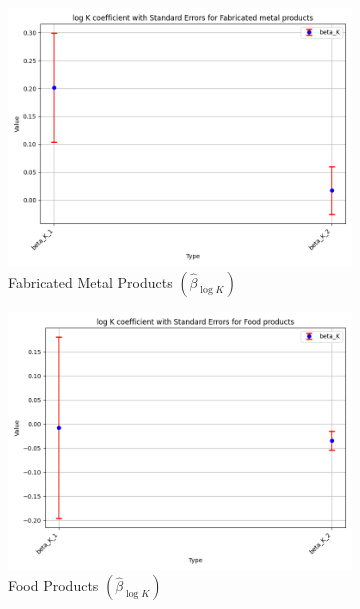 \documentclass{article}
\begin{document}
\begin{figure}[ht!]
    \begin{subfigure}[t]{0.32\textwidth}
        \centering
        \includegraphics[width=\textwidth]{figure/empirical_stat_mixture_kmshare_ciiu_beta_logK_with_error_bars_Fabricated metal products.png}
        \caption{Fabricated Metal Products $(\hat{\beta}_{\log K})$}
    \end{subfigure}
    \begin{subfigure}[t]{0.32\textwidth}
        \centering
        \includegraphics[width=\textwidth]{figure/empirical_stat_mixture_kmshare_ciiu_beta_logK_with_error_bars_Food products.png}
        \caption{Food Products $(\hat{\beta}_{\log K})$}
    \end{subfigure}
    \begin{subfigure}[t]{0.32\textwidth}

\end{subfigure}
\end{figure}
\end{document}
